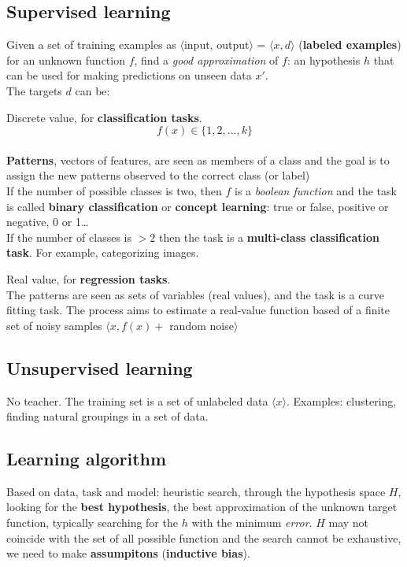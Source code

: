 \documentclass[10pt]{report}
\begin{document}
\subsection{Supervised learning} Given a set of training examples as $\langle$input, output$\rangle$ = $\langle x,d\rangle$ (\textbf{labeled examples}) for an unknown function $f$, find a \textit{good approximation} of $f$: an hypothesis $h$ that can be used for making predictions on unseen data $x'$.\\
The targets $d$ can be:
\begin{list}{}{}
	\item Discrete value, for \textbf{classification tasks}.\\
	$$f(x) \in \{1,2,\ldots,k\}$$\\
	\textbf{Patterns}, vectors of features, are seen as members of a class and the goal is to assign the new patterns observed to the correct class (or label)\\
	If the number of possible classes is two, then $f$ is a \textit{boolean function} and the task is called \textbf{binary classification} or \textbf{concept learning}: true or false, positive or negative, 0 or 1\ldots\\
	If the number of classes is $> 2$ then the task is a \textbf{multi-class classification task}. For example, categorizing images.
	\item Real value, for \textbf{regression tasks}.\\
	The patterns are seen as sets of variables (real values), and the task is a curve fitting task. The process aims to estimate a real-value function based of a finite set of noisy samples $\langle x, f(x) +$ random noise$\rangle$
\end{list}
\subsection{Unsupervised learning} No teacher. The training set is a set of unlabeled data $\langle x\rangle$. Examples: clustering, finding natural groupings in a set of data.
\subsection{Learning algorithm} Based on data, task and model: heuristic search, through the hypothesis space $H$, looking for the \textbf{best hypothesis}, the best approximation of the unknown target function, typically searching for the $h$ with the minimum \textit{error}. $H$ may not coincide with the set of all possible function and the search cannot be exhaustive, we need to make \textbf{assumpitons} (\textbf{inductive bias}).
\end{document}

